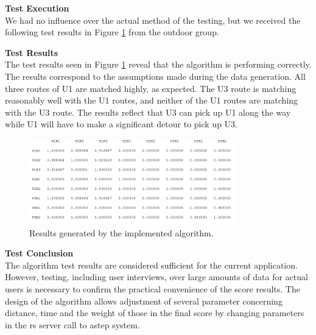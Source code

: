 \textbf{Test Execution}\\
We had no influence over the actual method of the testing, but we received the following test results in Figure \ref{fig:algresults} from the outdoor group.


\textbf{Test Results}\\
The test results seen in Figure \ref{fig:algresults} reveal that the algorithm is performing correctly.
The results correspond to the assumptions made during the data generation.
All three routes of U1 are matched highly, as expected.
The U3 route is matching reasonably well with the U1 routes, and neither of the U1 routes are matching with the U3 route.
The results reflect that U3 can pick up U1 along the way while U1 will have to make a significant detour to pick up U3.

\begin{figure}[h]
	\centering
	\includegraphics[width=0.8\textwidth]{figures/newtestresultrs.png}
	\caption{Results generated by the implemented algorithm.}
	\label{fig:algresults}
\end{figure}


\textbf{Test Conclusion}\\
The algorithm test results are considered sufficient for the current application. 
However, testing, including user interviews, over large amounts of data for actual users is necessary to confirm the practical convenience of the score results.
The design of the algorithm allows adjustment of several parameter concerning distance, time and the weight of those in the final score by changing parameters in the \gls{rs} server call to \gls{astep} system. 